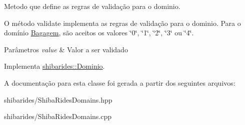Metodo que define as regras de validação para o dominio. 

O método validate implementa as regras de validação para o dominio. Para o domínio \hyperlink{classshibarides_1_1Bagagem}{Bagagem}, são aceitos os valores \char`\"{}0\char`\"{}, \char`\"{}1\char`\"{}, \char`\"{}2\char`\"{}, \char`\"{}3\char`\"{} ou \char`\"{}4\char`\"{}.


\begin{DoxyParams}{Parâmetros}
{\em value} & Valor a ser validado \\
\hline
\end{DoxyParams}


Implementa \hyperlink{classshibarides_1_1Dominio_acc9445531455c072bbf708709aebbe55}{shibarides\+::\+Dominio}.



A documentação para esta classe foi gerada a partir dos seguintes arquivos\+:\begin{DoxyCompactItemize}
\item 
shibarides/Shiba\+Rides\+Domains.\+hpp\item 
shibarides/Shiba\+Rides\+Domains.\+cpp\end{DoxyCompactItemize}

